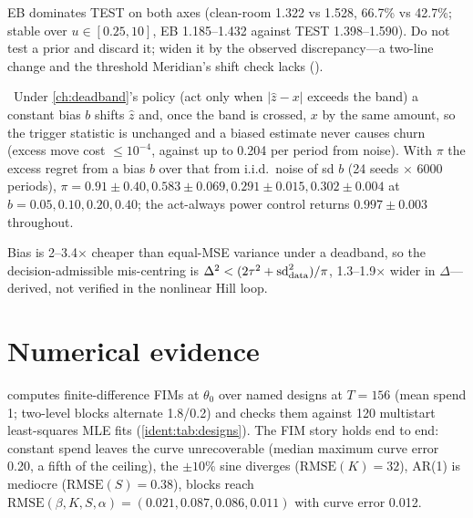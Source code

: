 EB dominates TEST on both axes (clean-room 1.322 vs 1.528, 66.7\% vs 42.7\%; stable over $u \in [0.25, 10]$, EB 1.185--1.432 against TEST 1.398--1.590). Do not test a prior and discard it; widen it by the observed discrepancy---a two-line change and the threshold Meridian's shift check lacks ().

\begin{proposition}
\label{ident:prop:deadband}
\tagNumerical\ Under \cref{ch:deadband}'s policy (act only when $|\hat z - x|$ exceeds the band) a constant bias $b$ shifts $\hat z$ and, once the band is crossed, $x$ by the same amount, so the trigger statistic is unchanged and a biased estimate never causes churn (excess move cost $\le 10^{-4}$, against up to 0.204 per period from noise). With $\pi$ the excess regret from a bias $b$ over that from i.i.d.\ noise of sd $b$ (24 seeds $\times$ 6000 periods), $\pi = 0.91 \pm 0.40, 0.583 \pm 0.069, 0.291 \pm 0.015, 0.302 \pm 0.004$ at $b = 0.05, 0.10, 0.20, 0.40$; the act-always power control returns $0.997 \pm 0.003$ throughout.
\end{proposition}

Bias is 2--3.4$\times$ cheaper than equal-MSE variance under a deadband, so the decision-admissible mis-centring is $\Delta^2 < (2\tau^2 + \mathrm{sd}_{\rm data}^2)/\pi$, 1.3--1.9$\times$ wider in $\Delta$---derived, not verified in the nonlinear Hill loop.

\section{Numerical evidence}
\label{ident:sec:numerics}

\emph{} computes finite-difference FIMs at $\theta_0$ over named designs at $T = 156$ (mean spend 1; two-level blocks alternate 1.8/0.2) and checks them against 120 multistart least-squares MLE fits (\cref{ident:tab:designs}). The FIM story holds end to end: constant spend leaves the curve unrecoverable (median maximum curve error 0.20, a fifth of the ceiling), the $\pm10\%$ sine diverges ($\mathrm{RMSE}(K) = 32$), AR(1) is mediocre ($\mathrm{RMSE}(S) = 0.38$), blocks reach $\mathrm{RMSE}(\beta, K, S, \alpha) = (0.021, 0.087, 0.086, 0.011)$ with curve error 0.012.

